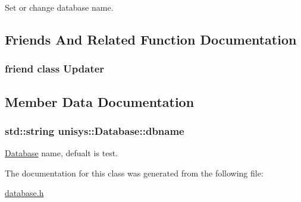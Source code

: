 Set or change database name. 



\subsection{Friends And Related Function Documentation}
\hypertarget{classunisys_1_1Database_a263621696f00d0fefadbd6b1b52da6b5}{
\subsubsection[{Updater}]{\setlength{\rightskip}{0pt plus 5cm}friend class {\bf Updater}\hspace{0.3cm}{\ttfamily [friend]}}}\label{classunisys_1_1Database_a263621696f00d0fefadbd6b1b52da6b5}


\subsection{Member Data Documentation}
\hypertarget{classunisys_1_1Database_a0643effdb77f75a9f569a6c1a9aeaf90}{
\subsubsection[{dbname}]{\setlength{\rightskip}{0pt plus 5cm}std\-::string unisys\-::\-Database\-::dbname\hspace{0.3cm}{\ttfamily [private]}}}\label{classunisys_1_1Database_a0643effdb77f75a9f569a6c1a9aeaf90}


\hyperlink{classunisys_1_1Database}{Database} name, defualt is test. 



The documentation for this class was generated from the following file\-:\begin{DoxyCompactItemize}
\item 
\hyperlink{database_8h}{database.\-h}\end{DoxyCompactItemize}
